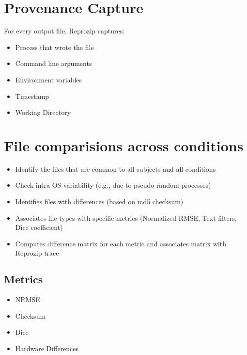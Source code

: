 \section{Provenance Capture}
\begin{flushleft}
For every output file, Reprozip captures: 
\end{flushleft}
\begin{itemize}
  \item Process that wrote the file
  \item Command line arguments
  \item Environment variables
  \item Timestamp
  \item Working Directory
\end{itemize}

\section{File comparisions across conditions}
\begin{itemize}
 \item Identify the files that are common to all subjects and all conditions
 \item Check intra-OS variability (e.g., due to pseudo-random processes)
 \item Identifies files with differences (based on md5 checksum)
 \item Associates file types with specific metrics (Normalized RMSE, Text filters, Dice coefficient)
 \item Computes difference matrix for each metric and associates matrix with Reprozip trace
\end{itemize}

\subsection{Metrics}
\begin{itemize}
\item NRMSE
\item Checksum
\item Dice
\item Hardware Differences
\end{itemize}
